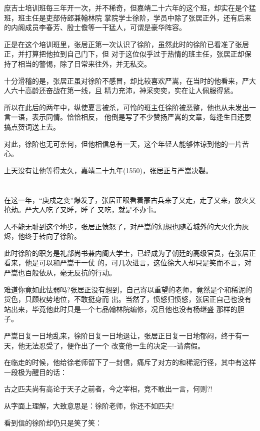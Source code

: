 \documentclass[11pt,a4paper,onecolumn]{article}
\begin{document}
庶吉士培训班每三年开一次，并不稀奇，但嘉靖二十六年的这个班，却实在是个猛班，班主任是吏部侍郎兼翰林院
掌院学士徐阶，学员中除了张居正外，还有后来的内阁成员李春芳、殷士儋等一干猛人，可谓是豪华阵容。

正是在这个培训班里，张居正第一次认识了徐阶，虽然此时的徐阶已看准了张居正，并打算把他拉到自己门下，但
对于这位似乎过于热情的班主任，张居正却保持了相当的警惕，除了日常来往外，并无私交。

十分滑稽的是，张居正虽对徐阶不感冒，却比较喜欢严嵩，在当时的他看来，严大人六十高龄还奋战在第一线，且
精力充沛，神采奕奕，实在让人佩服得紧。

所以在此后的两年中，纵使夏言被杀，可怜的班主任徐阶被恶整，他也从未发出一言一语，表示同情。恰恰相反，
他倒是写了不少赞扬严嵩的文章，每逢生日还要搞点贺词送上去。

对此，徐阶也无可奈何，但他相信总有一天，这个年轻人能够体谅到他的一片苦心。

上天没有让他等得太久，嘉靖二十九年(1550)，张居正与严嵩决裂。

\section[\thesection]{}

在这一年，``庚戍之变''爆发了，张居正眼看着蒙古兵来了又走，走了又来，放火又抢劫。严大人吃了又睡，睡了
又吃，就是不办事。

人不能无耻到这个地步，张居正愤怒了，对严嵩的幻想也随着城外的大火化为灰烬，他终于转向了徐阶。

此时徐阶的职务是礼部尚书兼内阁大学士，已经成为了朝廷的高级官员，在张居正看来，他是可以和严嵩干一仗
的，可几次进言，这位徐大人却只是笑而不言，对严嵩也百般依从，毫无反抗的行动。

难道你竟如此怯弱吗?张居正没有想到，自己寄以重望的老师，竟然是个和稀泥的货色，只顾权势地位，不敢挺身而
出。当然了，愤怒归愤怒，张居正自己也没有站出来，毕竟他此时只是一个七品翰林院编修，况且他也没有杨继盛
那样的胆子。

严嵩日复一日地乱来，徐阶日复一日地退让，张居正日复一日地郁闷，终于有一天，他无法忍受了，便作出了一个
改变他一生的决定----请病假。

在临走的时候，他给徐老师留下了一封信，痛斥了对方的和稀泥行径，其中有这样一段极为醒目的话：

古之匹夫尚有高论于天子之前者，今之宰相，竞不敢出一言，何则?!

从字面上理解，大致意思是：徐阶老师，你还不如匹夫!

看到信的徐阶却仍只是笑了笑：
\end{document}
